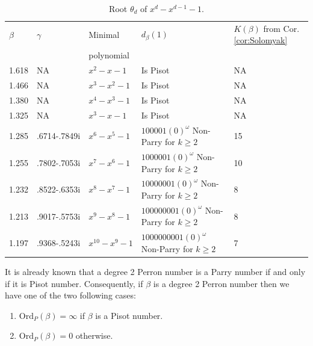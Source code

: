 \documentclass[12pt]{article}
\theoremstyle{plain}
\theoremstyle{remark}
\newcommand{\OrdP}{\mathrm{Ord}_{P}}
\begin{document}
\begin{table}
\begin{center}
\begin{tabular}{|lllp{110pt}l|} \hline
 $\beta$ & $\gamma$ & Minimal & $d_{\beta}(1)$ & $K(\beta)$ from Cor. \ref{cor:Solomyak} \\
 & & polynomial & & \\
 \hline
1.618 & NA & $x^{2}-x-1$ & Is Pisot & NA \\
1.466 & NA & $x^{3}-x^{2}-1$ & Is Pisot & NA \\
1.380 & NA& $x^{4}-x^{3}-1$ & Is Pisot & NA \\
1.325 & NA & $x^{3}-x-1$ & Is Pisot & NA \\
1.285 & .6714-.7849i & $x^{6}-x^{5}-1$ & $1 0 0 0 0 1 (0)^{\omega}$ \newline Non-Parry for $k \geq 2$ &15\\
1.255 & .7802-.7053i & $x^{7}-x^{6}-1$ & $1 0 0 0 0 0 1 (0)^{\omega}$ \newline Non-Parry for $k \geq 2$ &10\\
1.232 & .8522-.6353i & $x^{8}-x^{7}-1$ & $1 0 0 0 0 0 0 1 (0)^{\omega}$ \newline Non-Parry for $k \geq 2$ &8\\
1.213 & .9017-.5753i & $x^{9}-x^{8}-1$ & $1 0 0 0 0 0 0 0 1 (0)^{\omega}$ \newline Non-Parry for $k \geq 2$ &8\\
1.197 & .9368-.5243i & $x^{10}-x^{9}-1$ & $1 0 0 0 0 0 0 0 0 1 (0)^{\omega}$ \newline Non-Parry for $k \geq 2$ &7\\ \hline
\end{tabular}
\caption{Root $\theta_d$ of $x^d-x^{d-1}-1$.}
\label{tab:theta}
\end{center}
\end{table}




It is already known that a degree 2 Perron number is a Parry number if and only if it is Pisot  number. Consequently, if  $\beta$ is a degree 2 Perron number then  we have  one of  the two following cases:
\begin{enumerate}
    \item  $\OrdP(\beta) = \infty$ if $\beta$  is a Pisot number.
    \item  $\OrdP(\beta) = 0$ otherwise.
\end{enumerate}
\end{document}

